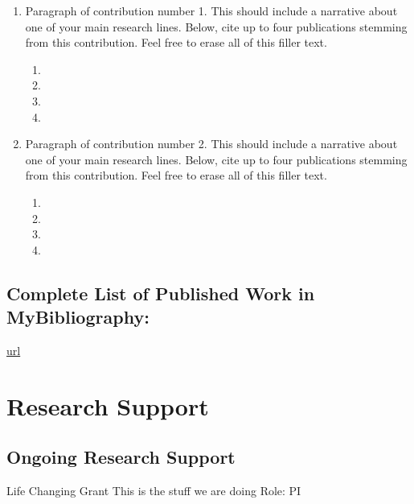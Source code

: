 \documentclass{nihbiosketch}
\providecommand{\tightlist}{\setlength{\itemsep}{0pt}\setlength{\parskip}{0pt}}
\begin{document}
\begin{enumerate}
\def\labelenumi{\arabic{enumi}.}
\tightlist
\item
  Paragraph of contribution number 1. This should include a narrative
  about one of your main research lines. Below, cite up to four
  publications stemming from this contribution. Feel free to erase all
  of this filler text.

  \begin{enumerate}
  \def\labelenumii{\arabic{enumii}.}
  \item
  \item
  \item
  \item
  \end{enumerate}
\item
  Paragraph of contribution number 2. This should include a narrative
  about one of your main research lines. Below, cite up to four
  publications stemming from this contribution. Feel free to erase all
  of this filler text.

  \begin{enumerate}
  \def\labelenumii{\arabic{enumii}.}
  \item
  \item
  \item
  \item
  \end{enumerate}
\end{enumerate}



  \subsection*{Complete List of Published Work in MyBibliography:} 
  \url{url}

  \section{Research Support}
  
        \subsection*{Ongoing Research Support}
    
            
      {Life Changing Grant}
      {This is the stuff we are doing}
      {Role: PI}
      
\end{document}
